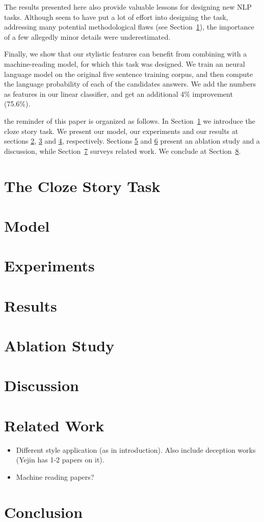 \documentclass[11pt,a4paper]{article}
\newcommand{\secref}[1]{Section~\ref{ssec:#1}}
\newcommand{\isection}[2]{\section{#1}\label{ssec:#2}}
\newcommand{\isectionb}[1]{\section{#1}\label{ssec:#1}}
\begin{document}
The results presented here also provide valuable lessons for designing new NLP tasks.
Although \cite{Mostafazadeh:2016} seem to have put a lot of effort into designing the task, 
addressing many potential methodological flaws (see \secref{ROC_Story}), the importance of a few allegedly minor details were underestimated. 

Finally, we show that our stylistic features can benefit from combining with a machine-reading model, for which this task was designed.
We train an neural language model on the original five sentence training corpus, and then compute the language probability of each of the candidates answers. 
We add the numbers as features in our linear classifier, and get an additional 4\% improvement (75.6\%).

the reminder of this paper is organized as follows. In \secref{ROC_Story} we introduce the cloze story task.
We present our model, our experiments and our results at sections \ref{ssec:Model}, \ref{ssec:Experiments} and \ref{ssec:Results}, respectively.
Sections \ref{ssec:Ablation} and \ref{ssec:Discussion} present an ablation study and a discussion, while \secref{Related}  surveys related work. 
We conclude at \secref{Conclusion}.

\isection{The Cloze Story Task}{ROC_Story}

\isectionb{Model}

\isectionb{Experiments}

\isectionb{Results}

\isection{Ablation Study}{Ablation}

\isectionb{Discussion}

\isection{Related Work}{Related}

\begin{itemize}
\item Different style application (as in introduction). Also include deception works (Yejin has 1-2 papers on it). 
\item Machine reading papers? 
\end{itemize}


\isectionb{Conclusion}




%
%

\newpage


\end{document}

